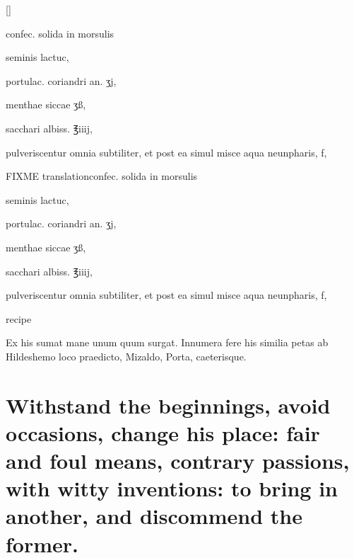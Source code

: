 \begin{Prescription}[H]
[\baselineskip]
\begin{prescriptionbox}{}{\textlatin{confec. solida in morsulis}}
\item \textlatin{seminis lactuc},
\item \textlatin{portulac. coriandri an. ʒj},
\item \textlatin{menthae siccae ʒß},
\item \textlatin{sacchari albiss. ℥iiij},
\item \textlatin{pulveriscentur omnia subtiliter, et post ea simul misce aqua neunpharis, f},
\end{prescriptionbox}
\begin{prescriptionbox}{FIXME translation}{\textlatin{confec. solida in morsulis}}
\item \textlatin{seminis lactuc},
\item \textlatin{portulac. coriandri an. ʒj},
\item \textlatin{menthae siccae ʒß},
\item \textlatin{sacchari albiss. ℥iiij},
\item \textlatin{pulveriscentur omnia subtiliter, et post ea simul misce aqua neunpharis, f},
\end{prescriptionbox}
\caption{ recipe}
\end{Prescription}

Ex his sumat mane unum quum
surgat. Innumera fere his similia petas ab Hildeshemo loco praedicto,
Mizaldo, Porta, caeterisque.

\section[Withstand the beginnings, avoid occasions of love]{Withstand the beginnings, avoid occasions, change his place: fair and foul means, contrary passions, with witty inventions: to bring in another, and discommend the former.}

